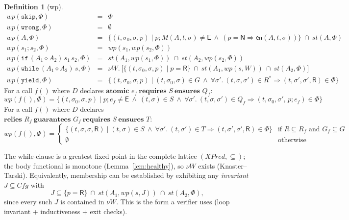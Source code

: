 \documentclass[11pt]{article}
\theoremstyle{plain}
\theoremstyle{plain}
\theoremstyle{definition}
\newtheorem{definition}{Definition}
\newcommand{\Cfg}{\mathit{Cfg}}
\newcommand{\XPred}{\mathit{XPred}}
\newcommand{\MR}{\mathsf{R}}
\newcommand{\MN}{\mathsf{N}}
\newcommand{\ME}{\mathsf{E}}
\newcommand{\wpx}{\mathit{wp}}
\newcommand{\stp}{\mathit{st}}
\newcommand{\en}{\mathsf{en}}
\newcommand{\tskip}{\mathtt{skip}}
\newcommand{\twrong}{\mathtt{wrong}}
\newcommand{\tyield}{\mathtt{yield}}
\newcommand{\kif}{\mathtt{if}}
\newcommand{\kwhile}{\mathtt{while}}
\newcommand{\cact}[2]{#1\diamond #2}                 %
\begin{document}
\begin{definition}[wp]\label{def:wp}
{\small
\[
\begin{array}{rcl}
\wpx(\tskip,\Phi) &=& \Phi\\[3pt]
\wpx(\twrong,\Phi) &=& \emptyset\\[3pt]
\wpx(A,\Phi) &=&
\{(t,\sigma_0,\sigma,p) \mid p;M(A,t,\sigma)\neq\ME\ \wedge\
(p=\MN\Rightarrow \en(A,t,\sigma))\}\ \cap\ \stp(A,\Phi)\\[3pt]
\wpx(s_1;s_2,\Phi) &=& \wpx(s_1,\wpx(s_2,\Phi))\\[3pt]
\wpx(\kif\,(\cact{A_1}{A_2})\,s_1\,s_2,\Phi) &=&
\stp(A_1,\wpx(s_1,\Phi))\ \cap\ \stp(A_2,\wpx(s_2,\Phi))\\[3pt]
\wpx(\kwhile\,(\cact{A_1}{A_2})\,s,\Phi) &=&
\nu W.\ \bigl[\{(t,\sigma_0,\sigma,p)\mid p=\MR\}\ \cap\
\stp(A_1,\wpx(s,W))\ \cap\ \stp(A_2,\Phi)\bigr]\\[3pt]
\wpx(\tyield,\Phi) &=&
\{(t,\sigma_0,\sigma,p) \mid (t,\sigma_0,\sigma)\in G\ \wedge\
\forall\sigma'.\ (t,\sigma,\sigma')\in R^* \Rightarrow (t,\sigma',\sigma',\MR)\in\Phi\}
\end{array}
\]
For a call $f()$ where $D$ declares
$\textbf{atomic } e_f\ \textbf{requires } S\ \textbf{ensures } Q_f$:
\[
\wpx(f(),\Phi) =
\{(t,\sigma_0,\sigma,p) \mid
p;e_f\neq\ME\ \wedge\ (t,\sigma)\in S\ \wedge\
\forall\sigma'.\ (t,\sigma,\sigma')\in Q_f \Rightarrow (t,\sigma_0,\sigma',\,p;e_f)\in\Phi\}
\]
For a call $f()$ where $D$ declares
$\textbf{relies } R_f\ \textbf{guarantees } G_f\ \textbf{requires } S\ \textbf{ensures } T$:
\[
\wpx(f(),\Phi) =
\begin{cases}
\{(t,\sigma,\sigma,\MR) \mid (t,\sigma)\in S\ \wedge\
\forall\sigma'.\ (t,\sigma')\in T \Rightarrow (t,\sigma',\sigma',\MR)\in\Phi\}
& \text{if } R\subseteq R_f \text{ and } G_f\subseteq G\\
\emptyset & \text{otherwise}
\end{cases}
\]
}
\end{definition}

The while-clause is a greatest fixed point in the complete lattice
$(\XPred,\subseteq)$; the body functional is monotone (Lemma~\ref{lem:healthy}),
so $\nu W$ exists (Knaster--Tarski). Equivalently, membership can be established by
exhibiting any \emph{invariant} $J\subseteq\Cfg$ with
\[
J \subseteq \{p=\MR\}\ \cap\ \stp(A_1,\wpx(s,J))\ \cap\ \stp(A_2,\Phi),
\]
since every such $J$ is contained in $\nu W$. This is the form a verifier uses
(loop invariant + inductiveness + exit checks).
\end{document}
